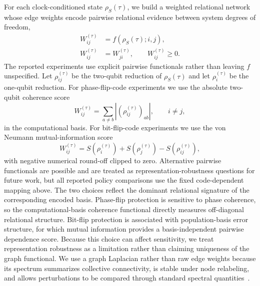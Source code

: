\documentclass{iopjournal}
\begin{document}
For each clock-conditioned state $\rho_S(\tau)$, we build a weighted relational
network whose edge weights encode pairwise relational evidence between system
degrees of freedom,
\begin{equation}
\begin{aligned}
W^{(\tau)}_{ij}
&=
f(\rho_S(\tau);i,j),\\
W^{(\tau)}_{ij}
&=
W^{(\tau)}_{ji},
\qquad
W^{(\tau)}_{ij}\ge 0.
\end{aligned}
\end{equation}
The reported experiments use explicit pairwise functionals rather than leaving
$f$ unspecified. Let $\rho_{ij}^{(\tau)}$ be the two-qubit reduction of
$\rho_S(\tau)$ and let $\rho_i^{(\tau)}$ be the one-qubit reduction. For
phase-flip-code experiments we use the absolute two-qubit coherence score
\begin{equation}
W^{(\tau)}_{ij}
=
\sum_{a\ne b}
\left|(\rho_{ij}^{(\tau)})_{ab}\right|,
\qquad i\ne j,
\label{eq:coherence-weight-main}
\end{equation}
in the computational basis. For bit-flip-code experiments we use the von Neumann
mutual-information score
\begin{equation}
W^{(\tau)}_{ij}
=
S(\rho_i^{(\tau)})
+
S(\rho_j^{(\tau)})
-
S(\rho_{ij}^{(\tau)}),
\label{eq:mutual-info-weight-main}
\end{equation}
with negative numerical round-off clipped to zero. Alternative pairwise
functionals are possible and are treated as representation-robustness questions
for future work, but all reported policy comparisons use the fixed code-dependent
mapping above.
The two choices reflect the dominant relational signature of the corresponding
encoded basis. Phase-flip protection is sensitive to phase coherence, so the
computational-basis coherence functional directly measures off-diagonal
relational structure. Bit-flip protection is associated with population-basis
error structure, for which mutual information provides a basis-independent
pairwise dependence score. Because this choice can affect
sensitivity, we treat representation robustness as a limitation rather than
claiming uniqueness of the graph functional.
We use a graph Laplacian rather than raw edge weights because its
spectrum summarizes collective connectivity, is stable under node relabeling, and
allows perturbations to be compared through standard spectral
quantities~\cite{JiangSpectralGraphTheory,Braunstein2006GraphLaplacianDensityMatrix,Adhikari2017WeightedDigraphsQuantumStates}.
\end{document}
